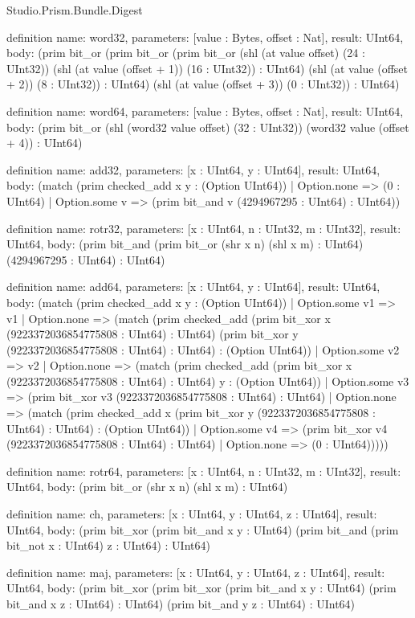 \begin{lexlean}{Studio.Prism.Bundle.Digest}
\begin{semanticmodule}
definition{
  name: word32,
  parameters: [value : Bytes, offset : Nat],
  result: UInt64,
  body: (prim bit_or (prim bit_or (prim bit_or (shl (at value offset) (24 : UInt32)) (shl (at value (offset + 1)) (16 : UInt32)) : UInt64) (shl (at value (offset + 2)) (8 : UInt32)) : UInt64) (shl (at value (offset + 3)) (0 : UInt32)) : UInt64)
}

definition{
  name: word64,
  parameters: [value : Bytes, offset : Nat],
  result: UInt64,
  body: (prim bit_or (shl (word32 value offset) (32 : UInt32)) (word32 value (offset + 4)) : UInt64)
}

definition{
  name: add32,
  parameters: [x : UInt64, y : UInt64],
  result: UInt64,
  body: (match (prim checked_add x y : (Option UInt64))
    | Option.none => (0 : UInt64)
    | Option.some v => (prim bit_and v (4294967295 : UInt64) : UInt64))
}

definition{
  name: rotr32,
  parameters: [x : UInt64, n : UInt32, m : UInt32],
  result: UInt64,
  body: (prim bit_and (prim bit_or (shr x n) (shl x m) : UInt64) (4294967295 : UInt64) : UInt64)
}

definition{
  name: add64,
  parameters: [x : UInt64, y : UInt64],
  result: UInt64,
  body: (match (prim checked_add x y : (Option UInt64))
    | Option.some v1 => v1
    | Option.none => (match (prim checked_add (prim bit_xor x (9223372036854775808 : UInt64) : UInt64) (prim bit_xor y (9223372036854775808 : UInt64) : UInt64) : (Option UInt64))
    | Option.some v2 => v2
    | Option.none => (match (prim checked_add (prim bit_xor x (9223372036854775808 : UInt64) : UInt64) y : (Option UInt64))
    | Option.some v3 => (prim bit_xor v3 (9223372036854775808 : UInt64) : UInt64)
    | Option.none => (match (prim checked_add x (prim bit_xor y (9223372036854775808 : UInt64) : UInt64) : (Option UInt64))
    | Option.some v4 => (prim bit_xor v4 (9223372036854775808 : UInt64) : UInt64)
    | Option.none => (0 : UInt64)))))
}

definition{
  name: rotr64,
  parameters: [x : UInt64, n : UInt32, m : UInt32],
  result: UInt64,
  body: (prim bit_or (shr x n) (shl x m) : UInt64)
}

definition{
  name: ch,
  parameters: [x : UInt64, y : UInt64, z : UInt64],
  result: UInt64,
  body: (prim bit_xor (prim bit_and x y : UInt64) (prim bit_and (prim bit_not x : UInt64) z : UInt64) : UInt64)
}

definition{
  name: maj,
  parameters: [x : UInt64, y : UInt64, z : UInt64],
  result: UInt64,
  body: (prim bit_xor (prim bit_xor (prim bit_and x y : UInt64) (prim bit_and x z : UInt64) : UInt64) (prim bit_and y z : UInt64) : UInt64)
}


\end{semanticmodule}
\end{lexlean}
